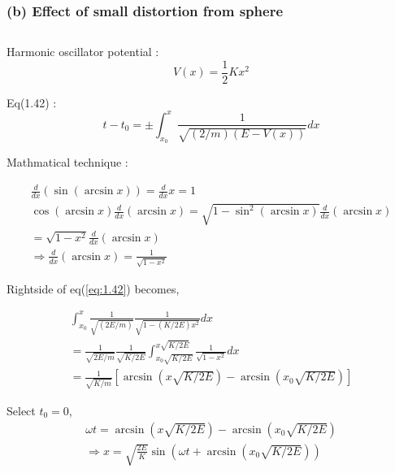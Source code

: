 \documentclass{jarticle}
\begin{document}
\subsubsection*{(b) Effect of small distortion from sphere} 

\subsection{}

\subsection{}\label{subsec:1.5}
Harmonic oscillator potential :
\begin{equation}
	V(x) = \frac{1}{2}Kx^2
\end{equation}

Eq(1.42) : 
\begin{equation}\label{eq:1.42}
	t-t_0 = \pm \int_{x_0}^x \frac{1}{\sqrt{(2/m)(E-V(x))}}dx
\end{equation}

Mathmatical technique : 

\begin{eqnarray}
	\frac{d}{dx}(\sin{(\arcsin{x})}) = \frac{d}{dx}x = 1 \nonumber \\
	\cos{(\arcsin{x})}\frac{d}{dx}(\arcsin{x}) = \sqrt{1-\sin^2{(\arcsin{x})}}\frac{d}{dx}(\arcsin{x}) \nonumber \\
	= \sqrt{1 - x^2}\frac{d}{dx}(\arcsin{x}) \nonumber \\
	\Rightarrow \frac{d}{dx}(\arcsin{x}) = \frac{1}{\sqrt{1-x^2}}
\end{eqnarray}

Rightside of eq(\ref{eq:1.42}) becomes,

\begin{eqnarray}
	\int_{x_0}^x \frac{1}{\sqrt{(2E/m)}}\frac{1}{\sqrt{1 - (K/2E)x^2}}dx \nonumber \\
	= \frac{1}{\sqrt{2E/m}} \frac{1}{\sqrt{K/2E}} \int_{x_0\sqrt{K/2E}}^{x\sqrt{K/2E}}\frac{1}{\sqrt{1-x^2}}dx \nonumber \\
	= \frac{1}{\sqrt{K/m}} \left[\arcsin{(x\sqrt{K/2E})} - \arcsin{(x_0\sqrt{K/2E})}\right] \nonumber
\end{eqnarray}

Select $t_0 = 0$, 
\begin{eqnarray}
	\omega t = \arcsin{(x\sqrt{K/2E})} - \arcsin{(x_0\sqrt{K/2E})} \nonumber \\
	\Rightarrow x = \sqrt{\frac{2E}{K}} \sin{\left(\omega t + \arcsin{(x_0\sqrt{K/2E})}\right)}
\end{eqnarray}
\end{document}

